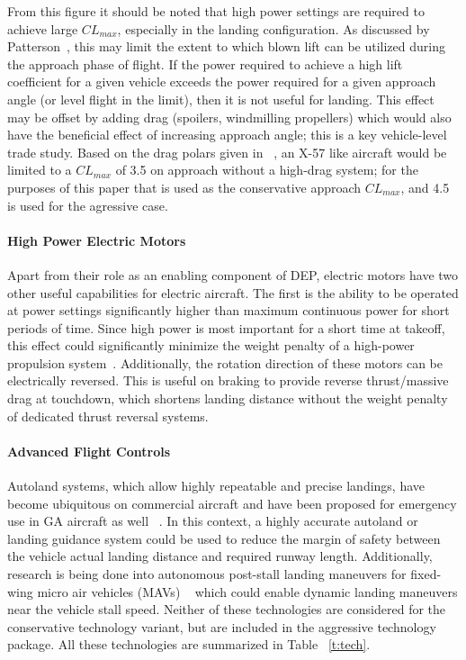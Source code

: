 \documentclass[]{aiaa-tc}%
\begin{document}
From this figure it should be noted that high power settings are required to achieve large $CL_{max}$, especially in the landing configuration.  As discussed by Patterson~\cite{Patterson2017}, this may limit the extent to which blown lift can be utilized during the approach phase of flight.  If the power required to achieve a high lift coefficient for a given vehicle exceeds the power required for a given approach angle (or level flight in the limit), then it is not useful for landing.  This effect may be offset by adding drag (spoilers, windmilling propellers) which would also have the beneficial effect of increasing approach angle; this is a key vehicle-level trade study.  Based on the drag polars given in ~\cite{Deere}, an X-57 like aircraft would be limited to a $CL_{max}$ of 3.5 on approach without a high-drag system; for the purposes of this paper that is used as the conservative approach $CL_{max}$, and 4.5 is used for the agressive case.  

\paragraph{High Power Electric Motors}
Apart from their role as an enabling component of DEP, electric motors have two other useful capabilities for electric aircraft.  The first is the ability to be operated at power settings significantly higher than maximum continuous power for short periods of time.  Since high power is most important for a short time at takeoff, this effect could significantly minimize the weight penalty of a high-power propulsion system~\cite{Moore_Mis}. Additionally, the rotation direction of these motors can be electrically reversed.  This is useful on braking to provide reverse thrust/massive drag at touchdown, which shortens landing distance without the weight penalty of dedicated thrust reversal systems.  

\paragraph{Advanced Flight Controls}
Autoland systems, which allow highly repeatable and precise landings, have become ubiquitous on commercial aircraft and have been proposed for emergency use in GA aircraft as well ~\cite{Siegel2012}.  In this context, a highly accurate autoland or landing guidance system could be used to reduce the margin of safety between the vehicle actual landing distance and required runway length.  Additionally, research is being done into autonomous post-stall landing maneuvers for fixed-wing micro air vehicles (MAVs) ~\cite{Moore_Perch} which could enable dynamic landing maneuvers near the vehicle stall speed.  Neither of these technologies are considered for the conservative technology variant, but are included in the aggressive technology package.  All these technologies are summarized in Table ~\ref{t:tech}. 
\end{document}
